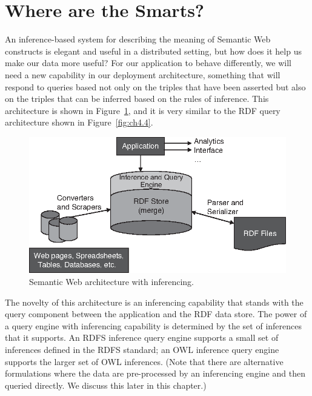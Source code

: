 \section{Where are the Smarts?}

An inference-based system for describing the meaning of Semantic Web
constructs is elegant and useful in a distributed setting, but how does
it help us make our data more useful? For our application to behave
differently, we will need a new capability in our deployment
architecture, something that will respond to queries based not only on
the triples that have been asserted but also on the triples that can be
inferred based on the rules of inference. This architecture is shown in
Figure~\ref{fig:ch7.1}, and it is very similar to the RDF query architecture shown
in Figure~\ref{fig:ch4.4}.

\begin{figure}
\centering
\includegraphics[width=5in]{media/ch7/f07-01.eps}
\caption{Semantic Web architecture with inferencing.}
\label{fig:ch7.1}
\end{figure}

The novelty of this architecture is an inferencing capability that
stands with the query component between the application and the RDF data
store. The power of a query engine with inferencing capability is
determined by the set of inferences that it supports. An RDFS inference
query engine supports a small set of inferences defined in the RDFS
standard; an OWL inference query engine supports the larger set of OWL
inferences. (Note that there are alternative formulations where the data
are pre-processed by an inferencing engine and then queried directly. We
discuss this later in this chapter.)

